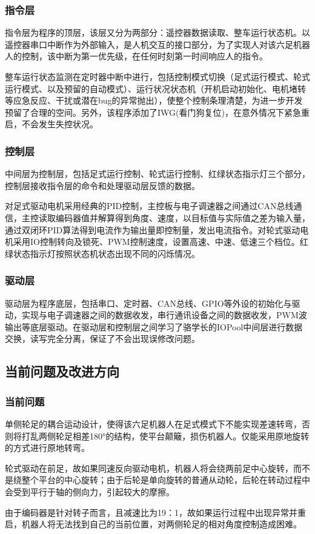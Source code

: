 \documentclass[a4paper, 11pt]{article}   %
\begin{document}
\begin{CJK}{UTF8}{gbsn}
\begin{spacing}{1.15}
\subsubsection{指令层}
指令层为程序的顶层，该层又分为两部分：遥控器数据读取、整车运行状态机。以遥控器串口中断作为外部输入，是人机交互的接口部分，为了实现人对该六足机器人的控制，该中断为第一优先级，在任何时刻第一时间响应人的指令。\par
整车运行状态监测在定时器中断中进行，包括控制模式切换（足式运行模式、轮式运行模式、以及预留的自动模式）、运行状况状态机（开机启动初始化、电机堵转等应急反应、干扰或潜在bug的异常抛出），使整个控制条理清楚，为进一步开发预留了合理的空间。另外，该程序添加了IWG(看门狗复位)，在意外情况下紧急重启，不会发生失控状况。
\subsubsection{控制层}
中间层为控制层，包括足式运行控制、轮式运行控制、红绿状态指示灯三个部分，控制层接收指令层的命令和处理驱动层反馈的数据。\par
对足式驱动电机采用经典的PID控制，主控板与电子调速器之间通过CAN总线通信，主控读取编码器值并解算得到角度、速度，以目标值与实际值之差为输入量，通过双闭环PID算法得到电流作为输出量即控制量，发出电流指令。对轮式驱动电机采用IO控制转向及锁死、PWM控制速度，设置高速、中速、低速三个档位。红绿状态指示灯按照状态机状态出现不同的闪烁情况。
\subsubsection{驱动层}
驱动层为程序底层，包括串口、定时器、CAN总线、GPIO等外设的初始化与驱动，实现与电子调速器之间的数据收发，串行通讯设备之间的数据收发，PWM波输出等底层驱动。在驱动层和控制层之间学习了骆学长的IOPool中间层进行数据交换，读写完全分离，保证了不会出现误修改问题。
\subsection{当前问题及改进方向}
\subsubsection{当前问题}
单侧轮足的耦合运动设计，使得该六足机器人在足式模式下不能实现差速转弯，否则将打乱两侧轮足相差180°的结构，使平台颠簸，损伤机器人。仅能采用原地旋转的方式进行原地转弯。\par
轮式驱动在前足，故如果同速反向驱动电机，机器人将会绕两前足中心旋转，而不是绕整个平台的中心旋转；由于后轮是单向旋转的普通从动轮，后轮在转动过程中会受到平行于轴的侧向力，引起较大的摩擦。\par
由于编码器是针对转子而言，且减速比为19：1，故如果运行过程中出现异常并重启，机器人将无法找到自己的当前位置，对两侧轮足的相对角度控制造成困难。

\end{spacing}
\end{CJK}
\end{document}
